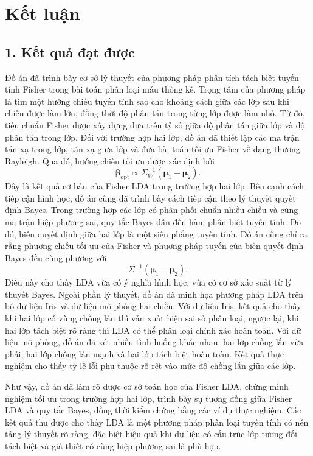 
\chapter*{Kết luận}

\section*{1. Kết quả đạt được}

Đồ án đã trình bày cơ sở lý thuyết của phương pháp phân tích tách biệt tuyến tính Fisher trong bài toán phân loại mẫu thống kê. Trọng tâm của phương pháp là tìm một hướng chiếu tuyến tính sao cho khoảng cách giữa các lớp sau khi chiếu được làm lớn, đồng thời độ phân tán trong từng lớp được làm nhỏ. Từ đó, tiêu chuẩn Fisher được xây dựng dựa trên tỷ số giữa độ phân tán giữa lớp và độ phân tán trong lớp. Đối với trường hợp hai lớp, đồ án đã thiết lập các ma trận tán xạ trong lớp, tán xạ giữa lớp và đưa bài toán tối ưu Fisher về dạng thương Rayleigh. Qua đó, hướng chiếu tối ưu được xác định bởi \[ \bm{\beta}_{\text{opt}} \propto \Sigma_W^{-1}(\bm{\mu}_1-\bm{\mu}_2). \] Đây là kết quả cơ bản của Fisher LDA trong trường hợp hai lớp. Bên cạnh cách tiếp cận hình học, đồ án cũng đã trình bày cách tiếp cận theo lý thuyết quyết định Bayes. Trong trường hợp các lớp có phân phối chuẩn nhiều chiều và cùng ma trận hiệp phương sai, quy tắc Bayes dẫn đến hàm phân biệt tuyến tính. Do đó, biên quyết định giữa hai lớp là một siêu phẳng tuyến tính. Đồ án cũng chỉ ra rằng phương chiếu tối ưu của Fisher và phương pháp tuyến của biên quyết định Bayes đều cùng phương với \[ \Sigma^{-1}(\bm{\mu}_1-\bm{\mu}_2). \] Điều này cho thấy LDA vừa có ý nghĩa hình học, vừa có cơ sở xác suất từ lý thuyết Bayes. Ngoài phần lý thuyết, đồ án đã minh họa phương pháp LDA trên bộ dữ liệu Iris và dữ liệu mô phỏng hai chiều. Với dữ liệu Iris, kết quả cho thấy khi hai lớp có vùng chồng lấn thì vẫn xuất hiện sai số phân loại; ngược lại, khi hai lớp tách biệt rõ ràng thì LDA có thể phân loại chính xác hoàn toàn. Với dữ liệu mô phỏng, đồ án đã xét nhiều tình huống khác nhau: hai lớp chồng lấn vừa phải, hai lớp chồng lấn mạnh và hai lớp tách biệt hoàn toàn. Kết quả thực nghiệm cho thấy tỷ lệ lỗi phụ thuộc rõ rệt vào mức độ chồng lấn giữa các lớp. 

Như vậy, đồ án đã làm rõ được cơ sở toán học của Fisher LDA, chứng minh nghiệm tối ưu trong trường hợp hai lớp, trình bày sự tương đồng giữa Fisher LDA và quy tắc Bayes, đồng thời kiểm chứng bằng các ví dụ thực nghiệm. Các kết quả thu được cho thấy LDA là một phương pháp phân loại tuyến tính có nền tảng lý thuyết rõ ràng, đặc biệt hiệu quả khi dữ liệu có cấu trúc lớp tương đối tách biệt và giả thiết có cùng hiệp phương sai là phù hợp.

